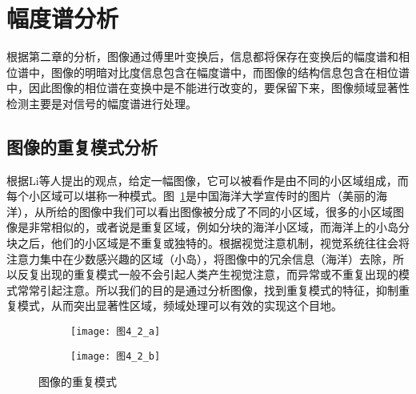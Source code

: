 \section{幅度谱分析}
\label{4_1}

根据第二章的分析，图像通过傅里叶变换后，信息都将保存在变换后的幅度谱和相位谱中，图像的明暗对比度信息包含在幅度谱中，而图像的结构信息包含在相位谱中，因此图像的相位谱在变换中是不能进行改变的，要保留下来，图像频域显著性检测主要是对信号的幅度谱进行处理。

\subsection{图像的重复模式分析}
\label{4_1_1}

根据Li等人\cite{LiJianTPAMI2013Scale}提出的观点，给定一幅图像，它可以被看作是由不同的小区域组成，而每个小区域可以堪称一种模式。图~\ref{图4_2}是中国海洋大学宣传时的图片（美丽的海洋），从所给的图像中我们可以看出图像被分成了不同的小区域，很多的小区域图像是非常相似的，或者说是重复区域，例如分块的海洋小区域，而海洋上的小岛分块之后，他们的小区域是不重复或独特的。根据视觉注意机制，视觉系统往往会将注意力集中在少数感兴趣的区域（小岛），将图像中的冗余信息（海洋）去除，所以反复出现的重复模式一般不会引起人类产生视觉注意，而异常或不重复出现的模式常常引起注意。所以我们的目的是通过分析图像，找到重复模式的特征，抑制重复模式，从而突出显著性区域，频域处理可以有效的实现这个目地。
\begin{figure}[h]
  \centering%
  \begin{subfigure}{0.38\textwidth}
    \texttt{[image: 图4\_2\_a]}
    \caption{}
  \end{subfigure}
  \hspace{4em}%
  \begin{subfigure}{0.45\textwidth}
    \texttt{[image: 图4\_2\_b]}
    \caption{}
  \end{subfigure}
  \caption{图像的重复模式}
  \label{图4_2}
\end{figure}

